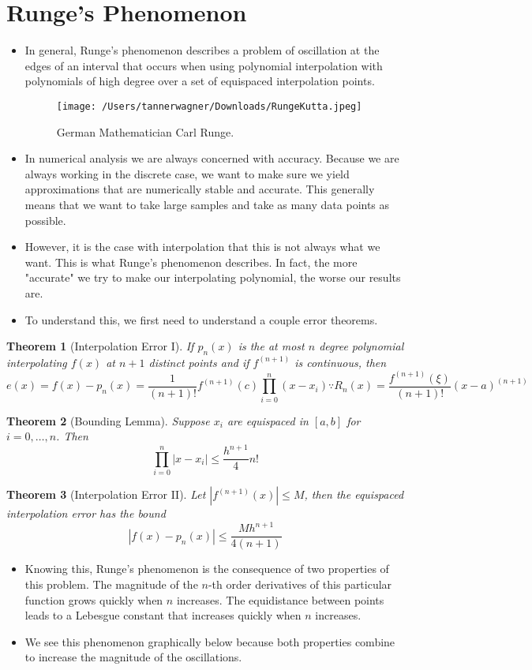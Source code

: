 \documentclass{article}
\newtheorem{theorem}{Theorem}
\begin{document}
\section{Runge's Phenomenon}
\begin{itemize}
\item In general, Runge's phenomenon describes a problem of oscillation at the edges of an interval that occurs when using polynomial interpolation with polynomials of high degree over a set of equispaced interpolation points. 
\begin{figure}[H]
\centering
\texttt{[image: /Users/tannerwagner/Downloads/RungeKutta.jpeg]}
\caption[Short caption]{German Mathematician Carl Runge.}
\end{figure}
\item In numerical analysis we are always concerned with accuracy. Because we are always working in the discrete case, we want to make sure we yield approximations that are numerically stable and accurate. This generally means that we want to take large samples and take as many data points as possible.
\item However, it is the case with interpolation that this is not always what we want. This is what Runge's phenomenon describes. In fact, the more "accurate" we try to make our interpolating polynomial, the worse our results are. 
\item To understand this, we first need to understand a couple error theorems.
\end{itemize}
\begin{theorem}[Interpolation Error I]
If $p_n(x)$ is the at most $n$ degree polynomial interpolating $f(x)$ at $n+1$ distinct points and if $f^{(n+1)}$ is continuous, then
\[
e(x)=f(x)-p_n(x)=\frac{1}{(n+1)!}f^{(n+1)}(c)\prod_{i=0}^{n}(x-x_i) \because R_n(x) = \frac{f^{(n+1)}(\xi)}{(n+1)!} (x-a)^{(n+1)}
\]
\end{theorem}
\begin{theorem}[Bounding Lemma]
Suppose $x_i$ are equispaced in $[a,b]$ for $i = 0,\dots,n$. Then
\[
\prod_{i=0}^{n}|x-x_i| \leq \frac{h^{n+1}}{4}n!
\]
\end{theorem}
\begin{theorem}[Interpolation Error II]
Let $|f^{(n+1)}(x)| \leq M$, then the equispaced interpolation error has the bound
\[
|f(x)-p_n(x)| \leq \frac{Mh^{n+1}}{4(n+1)}
\]
\end{theorem}
\begin{itemize}
\item Knowing this, Runge's phenomenon is the consequence of two properties of this problem.
\subitem The magnitude of the $n$-th order derivatives of this particular function grows quickly when $n$ increases.
\subitem The equidistance between points leads to a Lebesgue constant that increases quickly when $n$ increases. 
\item We see this phenomenon graphically below because both properties combine to increase the magnitude of the oscillations.
\end{itemize}
\end{document}

